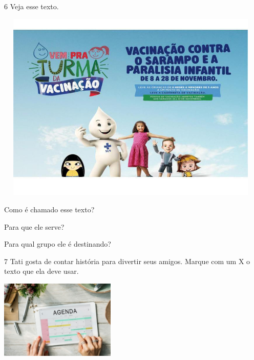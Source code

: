\num{6} Veja esse texto.


\includegraphics[width=5.14861in,height=3.58125in]{media/image107.jpeg}


\begin{escolha}
\item Como é chamado esse texto?


\item Para que ele serve?


\item Para qual grupo ele é destinando?

\end{escolha}

\num{7} Tati gosta de contar história para divertir seus amigos.
Marque com um X o texto que ela deve usar.

\includegraphics[width=2.16667in,height=1.47014in]{media/image108.jpeg}

